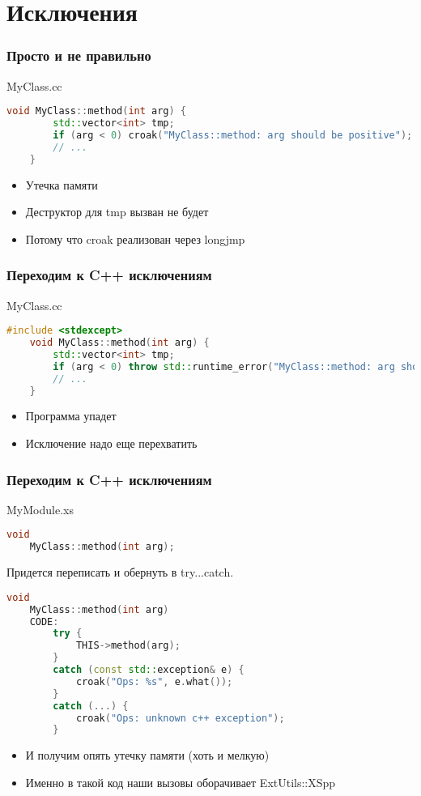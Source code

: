 \documentclass[utf8x,smaller]{beamer}
\begin{document}
\section{Исключения}

\begin{frame}[fragile]
    \frametitle{Просто и не правильно}
    MyClass.cc
    \begin{lstlisting}[language=C++,style=PerlXS]
    void MyClass::method(int arg) {
        std::vector<int> tmp;
        if (arg < 0) croak("MyClass::method: arg should be positive");
        // ...
    }
    \end{lstlisting}
    \begin{itemize}
        \item \alert{Утечка} памяти
        \item Деструктор для tmp вызван не будет
        \item Потому что croak реализован через longjmp
    \end{itemize}
\end{frame}

\begin{frame}[fragile]
    \frametitle{Переходим к C++ исключениям}
    MyClass.cc
    \begin{lstlisting}[language=C++,style=PerlXS]
    #include <stdexcept>
    void MyClass::method(int arg) {
        std::vector<int> tmp;
        if (arg < 0) throw std::runtime_error("MyClass::method: arg should be positive");
        // ...
    }
    \end{lstlisting}
    \begin{itemize}
        \item Программа упадет
        \item Исключение надо еще перехватить
    \end{itemize}
\end{frame}

\begin{frame}[fragile]
    \frametitle{Переходим к C++ исключениям}
    MyModule.xs
    \begin{lstlisting}[language=C++,style=PerlXS]
    void
    MyClass::method(int arg);
    \end{lstlisting}
    Придется переписать и обернуть в try...catch.
    \begin{lstlisting}[language=C++,style=PerlXS]
    void
    MyClass::method(int arg)
    CODE:
        try {
            THIS->method(arg);
        }
        catch (const std::exception& e) {
            croak("Ops: %s", e.what());
        }
        catch (...) {
            croak("Ops: unknown c++ exception");
        }
    \end{lstlisting}
    \begin{itemize}
        \item<2-| alert@2> И получим опять утечку памяти (хоть и мелкую)
        \item<3-> Именно в такой код наши вызовы оборачивает ExtUtils::XSpp
    \end{itemize}
\end{frame}
\end{document}
